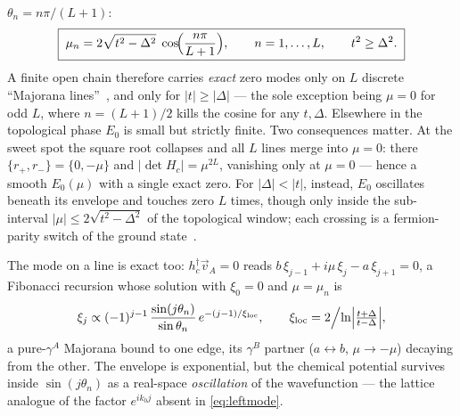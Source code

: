 $\theta_n = n\pi/(L+1)$:
\begin{equation}
  \boxed{\;
  \mu_n = 2\sqrt{t^2 - \Delta^2}\;
  \cos\!\Bigl(\frac{n\pi}{L+1}\Bigr),
  \qquad n = 1,\dots,L, \qquad t^2 \geq \Delta^2 .
  \;}
  \label{eq:majoranaline}
\end{equation}
A finite open chain therefore carries \emph{exact} zero modes only on $L$
discrete ``Majorana lines''~\cite{leumer2020}, and only for $|t| \ge |\Delta|$
--- the sole exception being $\mu = 0$ for odd $L$, where $n = (L+1)/2$ kills
the cosine for any $t,\Delta$. Elsewhere in the topological phase $E_0$ is
small but strictly finite. Two consequences matter. At the sweet spot the
square root collapses and all $L$ lines merge into $\mu = 0$: there
$\{r_+,r_-\} = \{0,-\mu\}$ and $|\det H_c| = \mu^{2L}$, vanishing only at
$\mu = 0$ --- hence a smooth $E_0(\mu)$ with a single exact zero. For
$|\Delta| < |t|$, instead, $E_0$ oscillates beneath its envelope and touches
zero $L$ times, though only inside the sub-interval
$|\mu| \le 2\sqrt{t^2-\Delta^2}$ of the topological window; each crossing is a
fermion-parity switch of the ground state~\cite{dassarma2012,hegde2016}.

The mode on a line is exact too: $h_c^\dagger \vec v_A = 0$ reads
$b\,\xi_{j-1} + i\mu\,\xi_j - a\,\xi_{j+1} = 0$, a Fibonacci recursion whose
solution with $\xi_0 = 0$ and $\mu = \mu_n$ is~\cite{leumer2021thesis}
\begin{equation}
  \xi_j \propto (-1)^{j-1}\,\frac{\sin(j\theta_n)}{\sin\theta_n}\,
  e^{-(j-1)/\xi_{\mathrm{loc}}},
  \qquad
  \xi_{\mathrm{loc}} = 2\Bigl/\ln\Bigl|\tfrac{t+\Delta}{t-\Delta}\Bigr| ,
  \label{eq:exactmode}
\end{equation}
a pure-$\gamma^A$ Majorana bound to one edge, its $\gamma^B$ partner
($a \leftrightarrow b$, $\mu \to -\mu$) decaying from the other. The envelope
is exponential, but the chemical potential survives inside $\sin(j\theta_n)$
as a real-space \emph{oscillation} of the wavefunction --- the lattice
analogue of the factor $e^{ik_0 j}$ absent in \eqref{eq:leftmode}.

